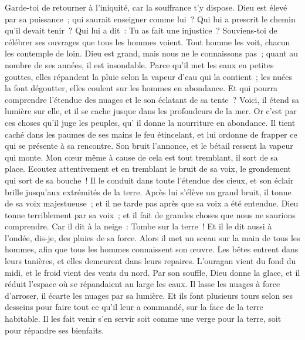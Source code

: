 \begin{multicols}{2}
Garde-toi de retourner à l'iniquité, car la souffrance t'y dispose.
Dieu est élevé par sa puissance~; qui saurait enseigner comme lui~?
Qui lui a prescrit le chemin qu'il devait tenir~? Qui lui a dit~: Tu as fait une injustice~?
Souviens-toi de célébrer ses ouvrages que tous les hommes voient.
Tout homme les voit, chacun les contemple de loin.
Dieu est grand, mais nous ne le connaissons pas~; quant au nombre de ses années, il est insondable.
Parce qu'il met les eaux en petites gouttes, elles répandent la pluie selon la vapeur d'eau qui la contient~;
les nuées la font dégoutter, elles coulent sur les hommes en abondance.
Et qui pourra comprendre l'étendue des nuages et le son éclatant de sa tente~?
Voici, il étend sa lumière sur elle, et il se cache jusque dans les profondeurs de la mer.
 Or c'est par ces choses qu'il juge les peuples, qu' il donne la nourriture en abondance.
 Il tient caché dans les paumes de ses mains le feu étincelant, et lui ordonne de frapper ce qui se présente à sa rencontre.
 Son bruit l'annonce, et le bétail ressent la vapeur qui monte.
\VerseOne{}Mon cœur même à cause de cela est tout tremblant, il sort de sa place.
Ecoutez attentivement et en tremblant le bruit de sa voix, le grondement qui sort de sa bouche~!
Il le conduit dans toute l'étendue des cieux, et son éclair brille jusqu'aux extrémités de la terre.
Après lui s'élève un grand bruit, il tonne de sa voix majestueuse~; et il ne tarde pas après que sa voix a été entendue.
Dieu tonne terriblement par sa voix~; et il fait de grandes choses que nous ne saurions comprendre.
Car il dit à la neige~: Tombe sur la terre~! Et il le dit aussi à l'ondée, dis-je, des pluies de sa force.
Alors il met un sceau sur la main de tous les hommes, afin que tous les hommes connaissent son œuvre.
Les bêtes entrent dans leurs tanières, et elles demeurent dans leurs repaires.
L'ouragan vient du fond du midi, et le froid vient des vents du nord.
Par son souffle, Dieu donne la glace, et il réduit l'espace où se répandaient au large les eaux.
Il lasse les nuages à force d'arroser, il écarte les nuages par sa lumière.
Et ils font plusieurs tours selon ses desseins pour faire tout ce qu'il leur a commandé, sur la face de la terre habitable.
Il les fait venir s'en servir soit comme une verge pour la terre, soit pour répandre ses bienfaits.

\end{multicols}
